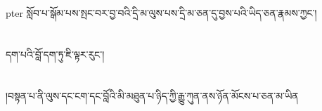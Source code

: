 pter{ }སློབ་པ་སྒོམ་པས་སྤང་བར་བྱ་བའི་དྲི་མ་ལུས་པས་དྲི་མ་ཅན་དུ་བྱས་པའི་ཡིད་ཅན་རྣམས་ཀྱང་།\chapter{ }དག་པའི་བློ་དག་ཏུ་ཇི་ལྟར་རུང་།\chapter{ }།བསྟན་པ་ནི་ལུས་དང་ངག་དང་བློའི་མི་མཐུན་པ་ཉིད་ཀྱི་རྒྱུ་ཀུན་ནས་ཉོན་མོངས་པ་ཅན་མ་ཡིན